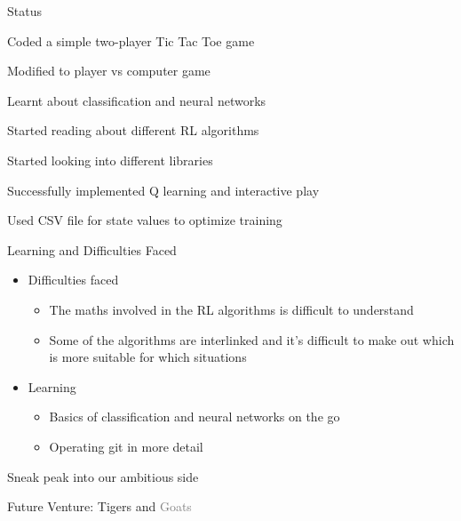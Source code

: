 \documentclass[14pt]{beamer}
\begin{document}
\begin{frame}{Status}
    \begin{description}[STATUS]
        \item[\color{myPink}{24 June}] Coded a simple two-player Tic Tac Toe game
        \item[\color{myPink}{27 June}] Modified to player vs computer game
        \item[\color{myPink}{28 June}] Learnt about classification and neural networks
        \item[\color{myPink}{29 June}] Started reading about different RL algorithms
        \item[\color{myPink}{04 July}] Started looking into different libraries
        \item[\color{myPink}{11 July}] Successfully implemented Q learning and interactive play
        \item[\color{myPink}{12 July}] Used CSV file for state values to optimize training
    \end{description}
\end{frame}

\begin{frame}{Learning and Difficulties Faced}
    \begin{itemize}
        \item Difficulties faced
            \begin{itemize}
                \item The maths involved in the RL algorithms is difficult to understand
                \item Some of the algorithms are interlinked and it's difficult to make out which is more suitable for which situations
            \end{itemize}
        \item Learning
            \begin{itemize}
            \item Basics of classification and neural networks on the go
            \item Operating git in more detail
            \end{itemize}
    \end{itemize}
\end{frame}

\begin{frame}{Sneak peak into our ambitious side}
    \begin{center}
        Future Venture: \textcolor{myAmber}{Tigers} and \textcolor{gray}{Goats}
    \end{center}
\end{frame}
\end{document}
